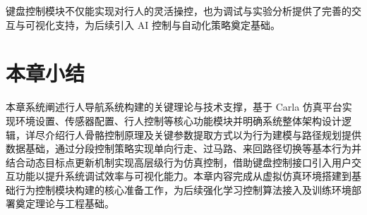 键盘控制模块不仅能实现对行人的灵活操控，也为调试与实验分析提供了完善的交互与可视化支持，为后续引入 AI 控制与自动化策略奠定基础。

\section{本章小结}

本章系统阐述行人导航系统构建的关键理论与技术支撑，基于 Carla 仿真平台实现环境设置、传感器配置、行人控制等核心功能模块并明确系统整体架构设计逻辑，详尽介绍行人骨骼控制原理及关键参数提取方式以为行为建模与路径规划提供数据基础，通过分段控制策略实现单向行走、过马路、来回路径切换等基本行为并结合动态目标点更新机制实现高层级行为仿真控制，借助键盘控制接口引入用户交互功能以提升系统调试效率与可视化能力。​
本章内容完成从虚拟仿真环境搭建到基础行为控制模块构建的核心准备工作，为后续强化学习控制算法接入及训练环境部署奠定理论与工程基础。
